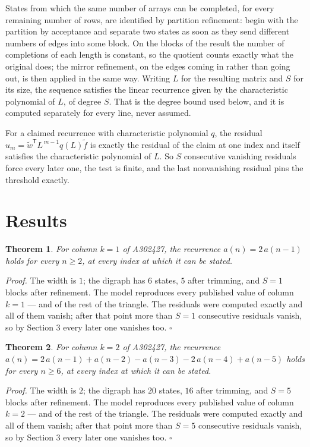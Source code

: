 \documentclass[11pt]{article}
\newtheorem{theorem}{Theorem}
\theoremstyle{definition}
\begin{document}
States from which the same number of arrays can be completed, for every remaining number of rows, are identified by partition refinement: begin with the partition by acceptance and separate two states as soon as they send different numbers of edges into some block. On the blocks of the result the number of completions of each length is constant, so the quotient counts exactly what the original does; the mirror refinement, on the edges coming in rather than going out, is then applied in the same way. Writing $L$ for the resulting matrix and $S$ for its size, the sequence satisfies the linear recurrence given by the characteristic polynomial of $L$, of degree $S$. That is the degree bound used below, and it is computed separately for every line, never assumed.

For a claimed recurrence with characteristic polynomial $q$, the residual $u_m = \tilde w^{\mathsf T}L^{\,m-1}q(L)\tilde f$ is exactly the residual of the claim at one index and itself satisfies the characteristic polynomial of $L$. So $S$ consecutive vanishing residuals force every later one, the test is finite, and the last nonvanishing residual pins the threshold exactly.

\section{Results}

\begin{theorem} For column $k = 1$ of A302427, the recurrence $a(n) = 2\,a(n-1)$ holds for every $n \ge 2$, at every index at which it can be stated.\end{theorem}

{\itshape Proof.} The width is $1$; the digraph has $6$ states, $5$ after trimming, and $S = 1$ blocks after refinement. The model reproduces every published value of column $k = 1$ --- and of the rest of the triangle. The residuals were computed exactly and all of them vanish; after that point more than $S = 1$ consecutive residuals vanish, so by Section 3 every later one vanishes too. $\square$

\begin{theorem} For column $k = 2$ of A302427, the recurrence $a(n) = 2\,a(n-1) + a(n-2) - a(n-3) - 2\,a(n-4) + a(n-5)$ holds for every $n \ge 6$, at every index at which it can be stated.\end{theorem}

{\itshape Proof.} The width is $2$; the digraph has $20$ states, $16$ after trimming, and $S = 5$ blocks after refinement. The model reproduces every published value of column $k = 2$ --- and of the rest of the triangle. The residuals were computed exactly and all of them vanish; after that point more than $S = 5$ consecutive residuals vanish, so by Section 3 every later one vanishes too. $\square$
\end{document}
